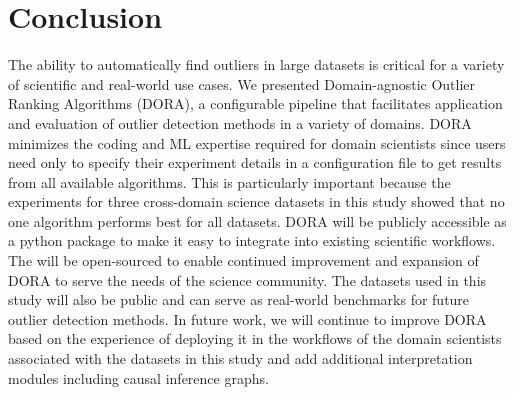 \documentclass[letterpaper]{article} %
\begin{document}
\section{Conclusion}
The ability to automatically find outliers in large datasets is critical
for a variety of scientific and real-world use cases. 
We presented Domain-agnostic Outlier Ranking Algorithms (DORA),
a configurable pipeline that facilitates application and evaluation of
outlier detection methods in a variety of domains. DORA minimizes the
coding and ML expertise required for domain scientists since users
need only to specify their experiment details in a configuration file
to get results from all available algorithms. This is particularly important
because the experiments for three cross-domain science datasets in this
study showed that no one algorithm performs best for all datasets.
DORA will be publicly accessible as a python package to make it
easy to integrate into existing scientific workflows. 
The will be
open-sourced to enable continued improvement and expansion of DORA
to serve the needs of the science community. The datasets used in this
study will also be public and can serve as real-world benchmarks 
for future outlier detection methods. In future work, we will
continue to improve DORA based on the experience of deploying it in
the workflows of the domain scientists associated with the datasets in
this study and add additional interpretation modules 
including causal inference graphs.

%
% 
%


\end{document}
